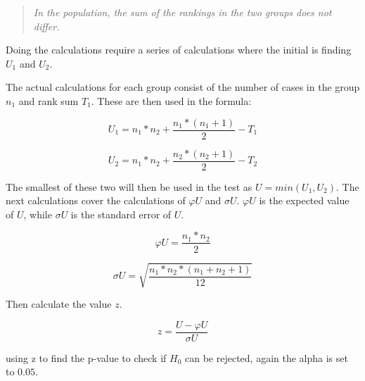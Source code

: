 \begin{quote}
    \textit{In the population, the sum of the rankings in the two groups does not differ.}
\end{quote}

Doing the calculations require a series of calculations where the initial is finding $U_1$ and $U_2$.

The actual calculations for each group consist of the number of cases in the group $n_1$ and rank sum $T_1$. These are then used in the formula:

\begin{equation}
    U_1 = n_1*n_2+\frac{n_1*(n_1+1)}{2}-T_1  
\end{equation}

\begin{equation}
    U_2 = n_1*n_2+\frac{n_2*(n_2+1)}{2}-T_2
\end{equation}

The smallest of these two will then be used in the test as $U=min(U_1,U_2)$. The next calculations cover the calculations of $\varphi U$ and $\sigma U$. $\varphi U$ is the expected value of $U$, while $\sigma U$ is the standard error of $U$.

\begin{equation}
    \varphi U = \frac{n_1*n_2}{2}
\end{equation}

\begin{equation}
    \sigma U = \sqrt{\frac{n_1*n_2*(n_1+n_2+1)}{12}}
\end{equation}

Then calculate the value $z$.

\begin{equation}
    z = \frac{U-\varphi U}{\sigma U}
\end{equation}

using z to find the p-value to check if $H_0$ can be rejected, again the alpha is set to $0.05$. 

